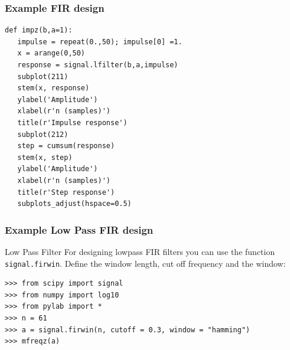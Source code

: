 \documentclass[10pt,colorlinks]{beamer}
\begin{document}
\begin{frame}[fragile]\frametitle{Example FIR design}
\small
\begin{verbatim}
def impz(b,a=1):
   impulse = repeat(0.,50); impulse[0] =1.
   x = arange(0,50)
   response = signal.lfilter(b,a,impulse)
   subplot(211)
   stem(x, response)
   ylabel('Amplitude') 
   xlabel(r'n (samples)')
   title(r'Impulse response')
   subplot(212)
   step = cumsum(response)
   stem(x, step)
   ylabel('Amplitude') 
   xlabel(r'n (samples)')
   title(r'Step response')
   subplots_adjust(hspace=0.5)   
\end{verbatim}


\end{frame}

\begin{frame}[fragile]\frametitle{Example Low Pass FIR design}
\begin{block}{Low Pass Filter}
For designing lowpass FIR filters you can use the function \verb|signal.firwin|. Define the window length, cut off frequency and the window:
\end{block}

\begin{verbatim}
>>> from scipy import signal 
>>> from numpy import log10
>>> from pylab import *
>>> n = 61
>>> a = signal.firwin(n, cutoff = 0.3, window = "hamming")
>>> mfreqz(a)
\end{verbatim}

\end{frame}
\end{document}
